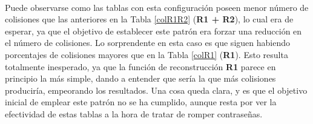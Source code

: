 \documentclass[12pt,spanish,listoffigures,listoftables]{tfgetsinf}
\begin{document}
\def\arraystretch{1.5}
\begin{table}[H]
	\centering
	\caption{Porcentajes de colisiones para las tablas empleando el patrón grande}
	\label{colPG}
\end{table}
~\\

Puede observarse como las tablas con esta configuración poseen menor número de colisiones que las anteriores en la Tabla \ref{colR1R2} (\textbf{R1 + R2}), lo cual era de esperar, ya que el objetivo de establecer este patrón era forzar una reducción en el número de colisiones. Lo sorprendente en esta caso es que siguen habiendo porcentajes de colisiones mayores que en la Tabla \ref{colR1} (\textbf{R1}). Esto resulta totalmente inesperado, ya que la función de reconstrucción \textbf{R1} parece en principio la más simple, dando a entender que sería la que más colisiones produciría, empeorando los resultados. Una cosa queda clara, y es que el objetivo inicial de emplear este patrón no se ha cumplido, aunque resta por ver la efectividad de estas tablas a la hora de tratar de romper contraseñas.
\end{document}
